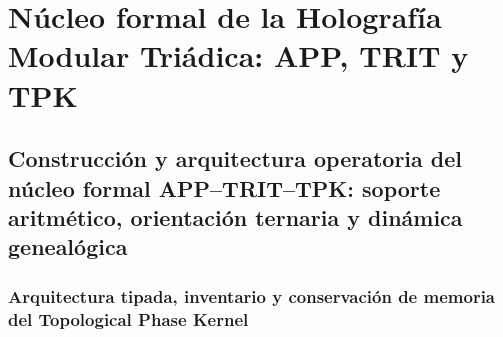 %




\part{Núcleo formal de la Holografía Modular Triádica: APP, TRIT y TPK}

\chapter{Construcción y arquitectura operatoria del núcleo formal APP–TRIT–TPK: soporte aritmético, orientación ternaria y dinámica genealógica}
\label{chap:sucesor-102-01}


\section{Arquitectura tipada, inventario y conservación de memoria del Topological Phase Kernel}
\label{sec:sucesor-102-propietarios-tpk}
\begin{HMTScientificOwnerSubordinated}


\end{HMTScientificOwnerSubordinated}
\begin{HMTScientificOwnerSubordinated}

\end{HMTScientificOwnerSubordinated}

